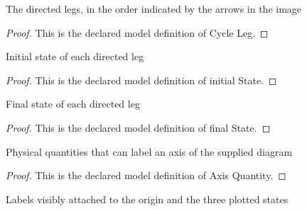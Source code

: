 \begin{definition}
  \label{def:physics:phyx-mini-0342:phyxminiproblems-problemphyxmini0342-cycleleg}
  The directed legs, in the order indicated by the arrows in the image
\end{definition}
\begin{proof}
  This is the declared model definition of Cycle Leg.
\end{proof}
\begin{definition}
  \label{def:physics:phyx-mini-0342:phyxminiproblems-problemphyxmini0342-cycleleg-initialstate}
  Initial state of each directed leg
\end{definition}
\begin{proof}
  This is the declared model definition of initial State.
\end{proof}
\begin{definition}
  \label{def:physics:phyx-mini-0342:phyxminiproblems-problemphyxmini0342-cycleleg-finalstate}
  Final state of each directed leg
\end{definition}
\begin{proof}
  This is the declared model definition of final State.
\end{proof}
\begin{definition}
  \label{def:physics:phyx-mini-0342:phyxminiproblems-problemphyxmini0342-axisquantity}
  Physical quantities that can label an axis of the supplied diagram
\end{definition}
\begin{proof}
  This is the declared model definition of Axis Quantity.
\end{proof}
\begin{definition}
  \label{def:physics:phyx-mini-0342:phyxminiproblems-problemphyxmini0342-figurepointlabel}
  Labels visibly attached to the origin and the three plotted states
\end{definition}
